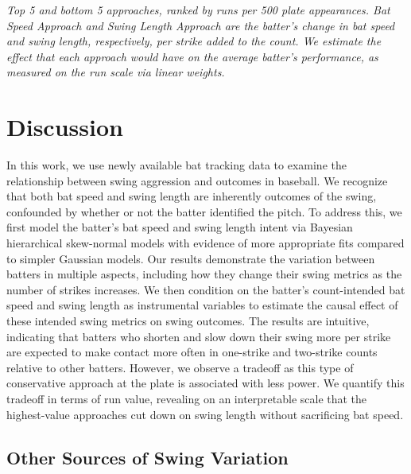 \documentclass{article}
\begin{document}
      \begin{table}
        \centering
        
        \caption{\it Top 5 and bottom 5 approaches, ranked by runs per 500 plate appearances. Bat Speed Approach and Swing Length Approach are the batter's change in bat speed and swing length, respectively, per strike added to the count. We estimate the effect that each approach would have on the average batter's performance, as measured on the run scale via linear weights.}
        \label{tab:approach-ranked}
      \end{table}

    
  \section{Discussion}
  \label{sec:discussion}


    In this work, we use newly available bat tracking data to examine the relationship between swing aggression and outcomes in baseball. We recognize that both bat speed and swing length are inherently outcomes of the swing, confounded by whether or not the batter identified the pitch. To address this, we first model the batter's bat speed and swing length intent via Bayesian hierarchical skew-normal models with evidence of more appropriate fits compared to simpler Gaussian models. Our results demonstrate the variation between batters in multiple aspects, including how they change their swing metrics as the number of strikes increases. We then condition on the batter's count-intended bat speed and swing length as instrumental variables to estimate the causal effect of these intended swing metrics on swing outcomes. The results are intuitive, indicating that batters who shorten and slow down their swing more per strike are expected to make contact more often in one-strike and two-strike counts relative to other batters. However, we observe a tradeoff as this type of conservative approach at the plate is associated with less power. We quantify this tradeoff in terms of run value, revealing on an interpretable scale that the highest-value approaches cut down on swing length without sacrificing bat speed. 

    \subsection{Other Sources of Swing Variation}
    \label{sec:results-other}
\end{document}
